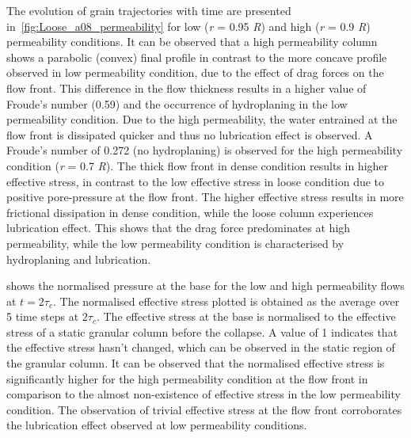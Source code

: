 \documentclass[12pt,a4paper,twocolumn,fleqn]{narms}
\begin{document}
The evolution of grain trajectories with time are presented 
in~\cref{fig:Loose_a08_permeability} for low (\textit{r} = 0.95 \textit{R}) and 
high (\textit{r} = 0.9 \textit{R})
permeability conditions. It can be observed that a high 
permeability column shows a parabolic (convex) final profile in contrast to the 
more concave profile observed in low permeability condition, due to the effect 
of drag forces on the flow front. This difference in the flow thickness results 
in a higher value of Froude's number (0.59) and the occurrence of hydroplaning 
in the low permeability condition. Due to the high permeability, the water 
entrained at the flow front is dissipated quicker and 
thus no lubrication effect is observed. A Froude's number of 0.272 (no 
hydroplaning) is observed for the high permeability condition (\textit{r} = 0.7 
\textit{R}). The 
thick flow front in dense condition results in higher effective stress, in 
contrast to the low effective stress in loose condition due to positive 
pore-pressure at the flow front. The higher effective stress results in more 
frictional dissipation in dense condition, while the loose column experiences
lubrication effect. This shows that the drag force predominates at high 
permeability, while the low permeability condition is characterised by 
hydroplaning and lubrication.

 shows the normalised pressure at the 
base for the low and high permeability flows at $ t = 2\tau_c$. The normalised 
effective stress plotted is obtained as the average over 5 time steps at 
$2\tau_c$. The effective stress at the base is normalised to the effective 
stress of a static granular column before the collapse. A value of 1 indicates 
that the effective stress hasn't changed, which can be observed in the static 
region of the granular column. It can be observed that the normalised effective 
stress is significantly higher for the high permeability condition at the flow 
front in comparison to the almost non-existence of effective stress in the low 
permeability condition. The observation of trivial effective stress at the flow 
front corroborates the lubrication effect observed at low permeability 
conditions.
\end{document}
